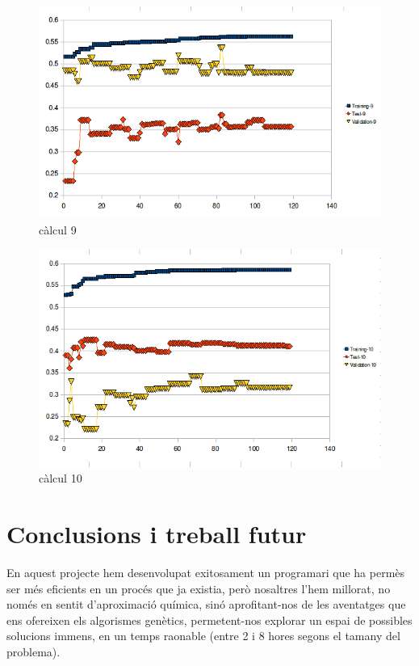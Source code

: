 \documentclass[titlepage,a4paper,12pt]{book}
\begin{document}
\begin{figure}[h]
\begin{center}
\includegraphics[scale=0.75]{pholus/pholus9.png}
\end{center}
\caption{càlcul 9}
\label{fig:pholusResult9}
\end{figure}

\begin{figure}[h]
\begin{center}
\includegraphics[scale=0.75]{pholus/pholus10.png}
\end{center}
\caption{càlcul 10}
\label{fig:pholusResult10}
\end{figure}

\section{Conclusions i treball futur} %
\label{sec:PConclusions i treball futur}
En aquest projecte hem desenvolupat exitosament un programari que ha permès ser
més eficients en un procés que ja existia, però nosaltres l'hem millorat, no
només en sentit d'aproximació química, sinó aprofitant-nos de les aventatges que
ens ofereixen els algorismes genètics, permetent-nos explorar un espai de
possibles solucions immens, en un temps raonable (entre 2 i 8 hores segons el
tamany del problema).
\end{document}
